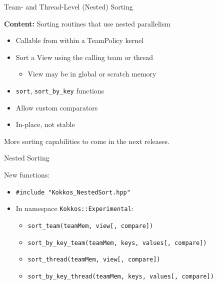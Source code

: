 

\begin{frame}[fragile]

  {\Huge Team- and Thread-Level (Nested) Sorting}

  \vspace{10pt}

  \textbf{Content:}
  Sorting routines that use nested parallelism
  \begin{itemize}
    \item Callable from within a TeamPolicy kernel
    \item Sort a View using the calling team or thread
    \begin{itemize}
      \item View may be in global or scratch memory
    \end{itemize}
    \item \texttt{sort}, \texttt{sort\_by\_key} functions
    \item Allow custom comparators
    \item In-place, not stable
  \end{itemize}

  \vspace{10pt}

  More sorting capabilities to come in the next releases.

\end{frame}


\begin{frame}[fragile]{Nested Sorting}

New functions:

\vspace{10pt}

\begin{itemize}
  \item \texttt{\#include "Kokkos\_NestedSort.hpp"}
  \item In namespace \texttt{Kokkos::Experimental}:
  \begin{itemize}
    \item \texttt{sort\_team(teamMem, view[, compare])}
    \item \texttt{sort\_by\_key\_team(teamMem, keys, values[, compare])}
    \item \texttt{sort\_thread(teamMem, view[, compare])}
    \item \texttt{sort\_by\_key\_thread(teamMem, keys, values[, compare])}
  \end{itemize}
\end{itemize}

\vspace{10pt}

\end{frame}

